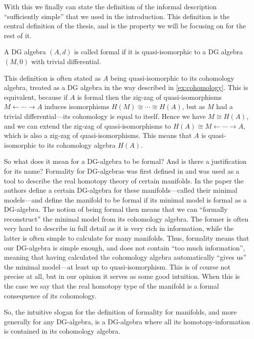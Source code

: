 With this we finally can state the definition of the informal description ``sufficiently simple'' that we used in the introduction. This definition is the central definition of the thesis, and is the property we will be focusing on for the rest of it. 

\begin{definition}
\label{def:formal_dga}
A DG algebra $(A, d)$ is called formal if it is quasi-isomorphic to a DG algebra $(M, 0)$ with trivial differential. 
\end{definition}

This definition is often stated as $A$ being quasi-isomorphic to its cohomology algebra, treated as a DG algebra in the way described in \ref{ex:cohomology}. This is equivalent, because if $A$ is formal then the zig-zag of quasi-isomorphisms $M \leftarrow \cdots \rightarrow A$ induces isomorphisms $H(M)\cong \cdots \cong H(A)$, but as $M$ had a trivial differential---its cohomology is equal to itself. Hence we have $M\cong H(A)$, and we can extend the zig-zag of quasi-isomorphisms to $H(A)\cong M \leftarrow \cdots \rightarrow A$, which is also a zig-zag of quasi-isomorphisms. This means that $A$ is quasi-isomorphic to its cohomology algebra $H(A)$. 

So what does it mean for a DG-algebra to be formal? And is there a justification for its name? Formality for DG-algebras was first defined in \cite{DGMS} and was used as a tool to describe the real homotopy theory of certain manifolds. In the paper the authors define a certain DG-algebra for these manifolds---called their minimal models---and define the manifold to be formal if its minimal model is formal as a DG-algebra. The notion of being formal then means that we can ``formally reconstruct'' the minimal model from its cohomology algebra. The former is often very hard to describe in full detail as it is very rich in information, while the latter is often simple to calculate for many manifolds. Thus, formality means that our DG-algebra is simple enough, and does not contain ``too much information'', meaning that having calculated the cohomology algebra automatically ``gives us'' the minimal model---at least up to quasi-isomorphism. This is of course not precise at all, but in our opinion it serves as some good intuition. When this is the case we say that the real homotopy type of the manifold is a formal consequence of its cohomology. 

So, the intuitive slogan for the definition of formality for manifolds, and more generally for any DG-algebra, is a DG-algebra where all its homotopy-information is contained in its cohomology algebra.


